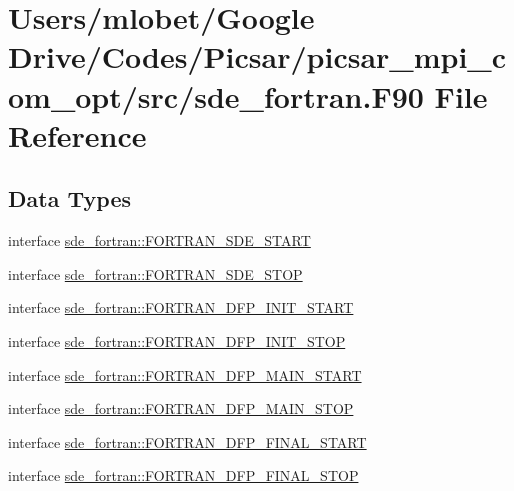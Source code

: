 \hypertarget{sde__fortran_8_f90}{}\section{Users/mlobet/\+Google Drive/\+Codes/\+Picsar/picsar\+\_\+mpi\+\_\+com\+\_\+opt/src/sde\+\_\+fortran.F90 File Reference}
\label{sde__fortran_8_f90}
\subsection*{Data Types}
\begin{DoxyCompactItemize}
\item 
interface \hyperlink{interfacesde__fortran_1_1_f_o_r_t_r_a_n___s_d_e___s_t_a_r_t}{sde\+\_\+fortran\+::\+F\+O\+R\+T\+R\+A\+N\+\_\+\+S\+D\+E\+\_\+\+S\+T\+A\+RT}
\item 
interface \hyperlink{interfacesde__fortran_1_1_f_o_r_t_r_a_n___s_d_e___s_t_o_p}{sde\+\_\+fortran\+::\+F\+O\+R\+T\+R\+A\+N\+\_\+\+S\+D\+E\+\_\+\+S\+T\+OP}
\item 
interface \hyperlink{interfacesde__fortran_1_1_f_o_r_t_r_a_n___d_f_p___i_n_i_t___s_t_a_r_t}{sde\+\_\+fortran\+::\+F\+O\+R\+T\+R\+A\+N\+\_\+\+D\+F\+P\+\_\+\+I\+N\+I\+T\+\_\+\+S\+T\+A\+RT}
\item 
interface \hyperlink{interfacesde__fortran_1_1_f_o_r_t_r_a_n___d_f_p___i_n_i_t___s_t_o_p}{sde\+\_\+fortran\+::\+F\+O\+R\+T\+R\+A\+N\+\_\+\+D\+F\+P\+\_\+\+I\+N\+I\+T\+\_\+\+S\+T\+OP}
\item 
interface \hyperlink{interfacesde__fortran_1_1_f_o_r_t_r_a_n___d_f_p___m_a_i_n___s_t_a_r_t}{sde\+\_\+fortran\+::\+F\+O\+R\+T\+R\+A\+N\+\_\+\+D\+F\+P\+\_\+\+M\+A\+I\+N\+\_\+\+S\+T\+A\+RT}
\item 
interface \hyperlink{interfacesde__fortran_1_1_f_o_r_t_r_a_n___d_f_p___m_a_i_n___s_t_o_p}{sde\+\_\+fortran\+::\+F\+O\+R\+T\+R\+A\+N\+\_\+\+D\+F\+P\+\_\+\+M\+A\+I\+N\+\_\+\+S\+T\+OP}
\item 
interface \hyperlink{interfacesde__fortran_1_1_f_o_r_t_r_a_n___d_f_p___f_i_n_a_l___s_t_a_r_t}{sde\+\_\+fortran\+::\+F\+O\+R\+T\+R\+A\+N\+\_\+\+D\+F\+P\+\_\+\+F\+I\+N\+A\+L\+\_\+\+S\+T\+A\+RT}
\item 
interface \hyperlink{interfacesde__fortran_1_1_f_o_r_t_r_a_n___d_f_p___f_i_n_a_l___s_t_o_p}{sde\+\_\+fortran\+::\+F\+O\+R\+T\+R\+A\+N\+\_\+\+D\+F\+P\+\_\+\+F\+I\+N\+A\+L\+\_\+\+S\+T\+OP}
\end{DoxyCompactItemize}
